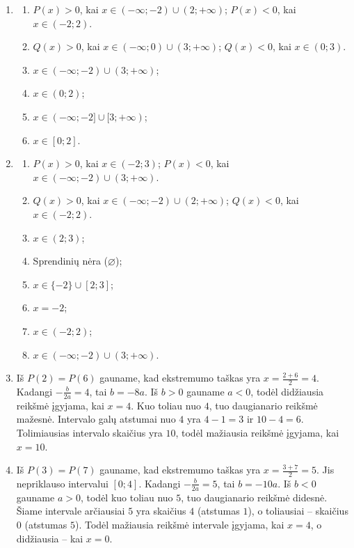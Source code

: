 \documentclass[11pt,a4paper]{article}
\begin{document}
\begin{enumerate}[label=\textbf{\arabic*.},leftmargin=2.6em,itemsep=0.85em,topsep=0.55em]
\item
\begin{enumerate}[label=\alph*),leftmargin=2em,itemsep=0.2em,topsep=0.2em]
  \item $P(x)>0$, kai $x\in(-\infty;-2)\cup(2;+\infty)$; $P(x)<0$, kai $x\in(-2;2)$.
  \item $Q(x)>0$, kai $x\in(-\infty;0)\cup(3;+\infty)$; $Q(x)<0$, kai $x\in(0;3)$.
  \item $x\in(-\infty;-2)\cup(3;+\infty)$;
  \item $x\in(0;2)$;
  \item $x\in(-\infty;-2]\cup[3;+\infty)$;
  \item $x\in[0;2]$.
\end{enumerate}

\item
\begin{enumerate}[label=\alph*),leftmargin=2em,itemsep=0.2em,topsep=0.2em]
  \item $P(x)>0$, kai $x\in(-2;3)$; $P(x)<0$, kai $x\in(-\infty;-2)\cup(3;+\infty)$.
  \item $Q(x)>0$, kai $x\in(-\infty;-2)\cup(2;+\infty)$; $Q(x)<0$, kai $x\in(-2;2)$.
  \item $x\in(2;3)$;
  \item Sprendinių nėra ($\varnothing$);
  \item $x\in\{-2\}\cup[2;3]$;
  \item $x=-2$;
  \item $x\in(-2;2)$;
  \item $x\in(-\infty;-2)\cup(3;+\infty)$.
\end{enumerate}

\item Iš $P(2)=P(6)$ gauname, kad ekstremumo taškas yra $x=\frac{2+6}{2}=4$. Kadangi $-\frac{b}{2a}=4$, tai $b=-8a$. Iš $b>0$ gauname $a<0$, todėl didžiausia reikšmė įgyjama, kai $x=4$. Kuo toliau nuo $4$, tuo daugianario reikšmė mažesnė. Intervalo galų atstumai nuo $4$ yra $4-1=3$ ir $10-4=6$. Tolimiausias intervalo skaičius yra $10$, todėl mažiausia reikšmė įgyjama, kai $x=10$.

\item Iš $P(3)=P(7)$ gauname, kad ekstremumo taškas yra $x=\frac{3+7}{2}=5$. Jis nepriklauso intervalui $[0;4]$. Kadangi $-\frac{b}{2a}=5$, tai $b=-10a$. Iš $b<0$ gauname $a>0$, todėl kuo toliau nuo $5$, tuo daugianario reikšmė didesnė. Šiame intervale arčiausiai $5$ yra skaičius $4$ (atstumas $1$), o toliausiai -- skaičius $0$ (atstumas $5$). Todėl mažiausia reikšmė intervale įgyjama, kai $x=4$, o didžiausia -- kai $x=0$.


\end{enumerate}
\end{document}
